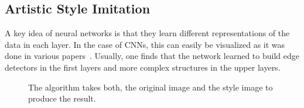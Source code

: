 \subsection{Artistic Style Imitation}
A key idea of neural networks is that they learn different representations of
the data in each layer. In the case of \glspl{CNN}, this can easily be
visualized as it was done in various papers~\cite{zeiler2014visualizing}.
Usually, one finds that the network learned to build edge detectors in the
first layers and more complex structures in the upper layers.

\begin{figure}
\centering
{}%

\caption{The algorithm takes both, the original image and the style image  to produce the result.}
\label{fig:neural-style}
\end{figure}

